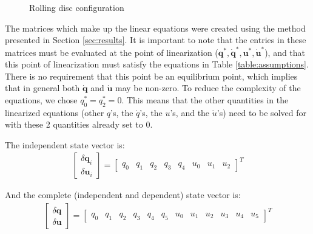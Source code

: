 \documentclass[smallcondensed]{svjour3}                     %
\begin{document}
\begin{figure}
  \centering
  
  \caption{Rolling disc configuration}
  \label{fig:disc}
\end{figure}

The matrices which make up the linear equations were created using the method
presented in Section \ref{sec:results}. It is important to note that the
entries in these matrices must be evaluated at the point of linearization
($\bm{q}^*, \bm{\dot{q}}^*, \bm{u}^*, \bm{\dot{u}}^*$), and that this point of
linearization must satisfy the equations in Table \ref{table:assumptions}.
There is no requirement that this point be an equilibrium point, which implies
that in general both $\bm{\dot{q}}$ and $\bm{\dot{u}}$ may be non-zero. To
reduce the complexity of the equations, we chose $q_0^* = q_2^* = 0$.  This
means that the other quantities in the linearized equations (other $q$'s, the
$\dot{q}$'s, the $u$'s, and the $\dot{u}$'s) need to be solved for with these 2
quantities already set to 0.

The independent state vector is:
\begin{align}
\begin{bmatrix}
\delta \bm{q}_i \\
\delta \bm{u}_i
\end{bmatrix} =
\begin{bmatrix}
q_0 &
q_1 &
q_2 &
q_3 &
q_4 &
u_0 &
u_1 &
u_2
\end{bmatrix}^T
\end{align}

And the complete (independent and dependent) state vector is:
\begin{align}
\begin{bmatrix}
\delta \bm{q} \\
\delta \bm{u}
\end{bmatrix} =
\left[
\begin{array}{cccccccccccc}
q_0 &
q_1 &
q_2 &
q_3 &
q_4 &
q_5 &
u_0 &
u_1 &
u_2 &
u_3 &
u_4 &
u_5
\end{array}
\right]^T
\end{align}
\end{document}

